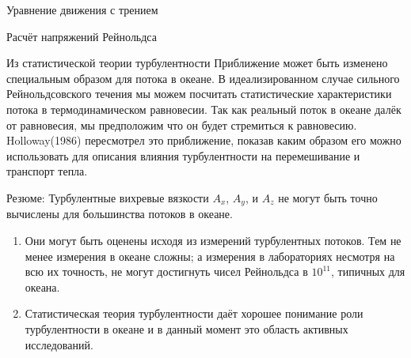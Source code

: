 \begin{chapter}{Уравнение движения с трением}
\begin{section}{Расчёт напряжений Рейнольдса}
\begin{paragraph}{Из статистической теории турбулентности}
Приближение может быть изменено специальным образом для потока в
океане. В идеализированном случае сильного Рейнольдсовского течения мы
можем посчитать статистические характеристики потока в
термодинамическом равновесии. Так как реальный поток в океане далёк от
равновесия, мы предположим что он будет стремиться к
равновесию. Holloway(1986) пересмотрел это приближение, показав каким
образом его можно использовать для описания влияния турбулентности на
перемешивание и транспорт тепла.
%
\end{paragraph}

\begin{paragraph}{Резюме:}
Турбулентные вихревые вязкости $A_x$, $A_y$, и $A_z$ не могут быть точно
вычислены для большинства потоков в океане.
%

\begin{enumerate}
\item
Они могут быть оценены исходя из измерений турбулентных потоков. Тем
не менее измерения в океане сложны; а измерения в лабораториях
несмотря на всю их точность, не могут достигнуть чисел Рейнольдса в
$10^{11}$, типичных для океана.
%

\item
Статистическая теория турбулентности даёт хорошее понимание роли
турбулентности в океане и в данный момент это область активных
исследований.
%
\end{enumerate}


\end{paragraph}
\end{section}
\end{chapter}
